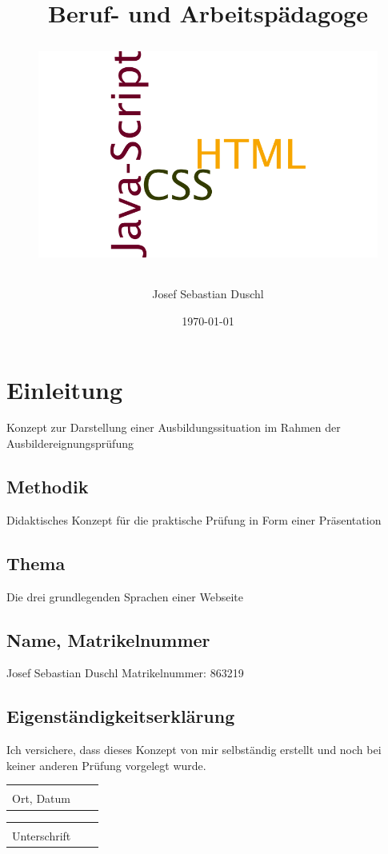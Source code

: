 \documentclass[a4paper, 12pt]{article}
\title{
	Beruf- und Arbeitspädagoge\\
	 \thema
	\newline
	\begin{figure}[h!]
		\vspace{15mm}
	\includegraphics[scale=0.2, width=\linewidth]{../pics/htmlCssJsWordwordle.png}
\end{figure}
	\vfill
}
\author{
	Josef Sebastian Duschl
}
\date{\today}
\newcommand{\thema}{Die drei grundlegenden Sprachen einer Webseite}
\begin{document}


    \maketitle
    \newpage

    \tableofcontents %
    \newpage

	\section{Einleitung}
	Konzept zur Darstellung einer Ausbildungssituation im Rahmen der Ausbildereignungsprüfung

    \subsection{Methodik}
        Didaktisches Konzept für die praktische Prüfung in Form einer Präsentation
    
    \subsection{Thema}
    \thema
    
    \subsection{Name, Matrikelnummer}
    Josef Sebastian Duschl \hfill Matrikelnummer: 863219
    
    \subsection{Eigenständigkeitserklärung }
    Ich versichere, dass dieses Konzept von mir selbständig erstellt und noch bei keiner anderen Prüfung vorgelegt wurde.\\
    
    \vspace{1,5 cm} 
    \begin{tabular}{p{7cm}p{.5cm}l}
    	\dotfill \\ 
    	Ort, Datum
    \end{tabular}%
    \hfill 
    \begin{tabular}{p{7cm}p{.5cm}l}
    	\dotfill \\ 
    	Unterschrift
    \end{tabular}
\end{document}
